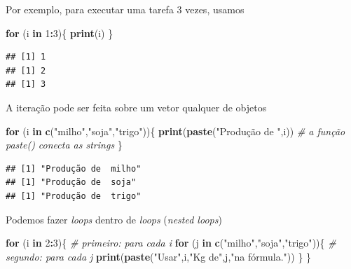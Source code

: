 \documentclass[
]{book}
\newenvironment{Shaded}{\begin{snugshade}}{\end{snugshade}}
\newcommand{\CommentTok}[1]{\textcolor[rgb]{0.56,0.35,0.01}{\textit{#1}}}
\newcommand{\ControlFlowTok}[1]{\textcolor[rgb]{0.13,0.29,0.53}{\textbf{#1}}}
\newcommand{\DecValTok}[1]{\textcolor[rgb]{0.00,0.00,0.81}{#1}}
\newcommand{\KeywordTok}[1]{\textcolor[rgb]{0.13,0.29,0.53}{\textbf{#1}}}
\newcommand{\NormalTok}[1]{#1}
\newcommand{\OperatorTok}[1]{\textcolor[rgb]{0.81,0.36,0.00}{\textbf{#1}}}
\newcommand{\StringTok}[1]{\textcolor[rgb]{0.31,0.60,0.02}{#1}}
\theoremstyle{definition}
\theoremstyle{definition}
\theoremstyle{definition}
\theoremstyle{remark}
\begin{document}
Por exemplo, para executar uma tarefa 3 vezes, usamos

\begin{Shaded}
\begin{Highlighting}[]
\ControlFlowTok{for}\NormalTok{ (i }\ControlFlowTok{in} \DecValTok{1}\OperatorTok{:}\DecValTok{3}\NormalTok{)\{}
  \KeywordTok{print}\NormalTok{(i)}
\NormalTok{\}}
\end{Highlighting}
\end{Shaded}

\begin{verbatim}
## [1] 1
## [1] 2
## [1] 3
\end{verbatim}

A iteração pode ser feita sobre um vetor qualquer de objetos

\begin{Shaded}
\begin{Highlighting}[]
\ControlFlowTok{for}\NormalTok{ (i }\ControlFlowTok{in} \KeywordTok{c}\NormalTok{(}\StringTok{"milho"}\NormalTok{,}\StringTok{"soja"}\NormalTok{,}\StringTok{"trigo"}\NormalTok{))\{}
  \KeywordTok{print}\NormalTok{(}\KeywordTok{paste}\NormalTok{(}\StringTok{"Produção de "}\NormalTok{,i))  }\CommentTok{# a função paste() conecta as strings}
\NormalTok{\}}
\end{Highlighting}
\end{Shaded}

\begin{verbatim}
## [1] "Produção de  milho"
## [1] "Produção de  soja"
## [1] "Produção de  trigo"
\end{verbatim}

Podemos fazer \emph{loops} dentro de \emph{loops} (\emph{nested loops})

\begin{Shaded}
\begin{Highlighting}[]
\ControlFlowTok{for}\NormalTok{ (i }\ControlFlowTok{in} \DecValTok{2}\OperatorTok{:}\DecValTok{3}\NormalTok{)\{}
  \CommentTok{# primeiro: para cada i}
  \ControlFlowTok{for}\NormalTok{ (j }\ControlFlowTok{in} \KeywordTok{c}\NormalTok{(}\StringTok{"milho"}\NormalTok{,}\StringTok{"soja"}\NormalTok{,}\StringTok{"trigo"}\NormalTok{))\{}
    \CommentTok{# segundo: para cada j }
    \KeywordTok{print}\NormalTok{(}\KeywordTok{paste}\NormalTok{(}\StringTok{"Usar"}\NormalTok{,i,}\StringTok{"Kg de"}\NormalTok{,j,}\StringTok{"na fórmula."}\NormalTok{))}
\NormalTok{  \}}
\NormalTok{\}}
\end{Highlighting}
\end{Shaded}
\end{document}
